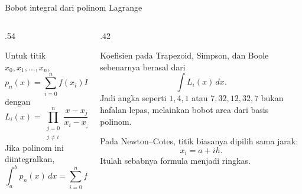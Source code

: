 \documentclass[aspectratio=169,10pt]{beamer}
\begin{document}
\begin{frame}{Bobot integral dari polinom Lagrange}
\scriptsize
\begin{columns}[T,totalwidth=\textwidth]
\begin{column}{.54\textwidth}
\begin{bluebox}
Untuk titik $x_0,x_1,\ldots,x_n$,
\[
p_n(x)=\sum_{i=0}^{n} f(x_i)L_i(x),
\]
dengan
\[
L_i(x)=\prod_{\substack{j=0\\ j\ne i}}^n \frac{x-x_j}{x_i-x_j}.
\]
Jika polinom ini diintegralkan,
\[
\int_a^b p_n(x)\,dx
=\sum_{i=0}^n f(x_i)\int_a^b L_i(x)\,dx.
\]
\end{bluebox}
\end{column}
\begin{column}{.42\textwidth}
\begin{greenbox}
Koefisien pada Trapezoid, Simpson, dan Boole sebenarnya berasal dari
\[
\int L_i(x)\,dx.
\]
Jadi angka seperti $1,4,1$ atau $7,32,12,32,7$ bukan hafalan lepas, melainkan bobot area dari basis polinom.
\end{greenbox}
\begin{orangebox}
Pada Newton--Cotes, titik biasanya dipilih sama jarak:
\[
x_i=a+ih.
\]
Itulah sebabnya formula menjadi ringkas.
\end{orangebox}
\end{column}
\end{columns}
\end{frame}
\end{document}

